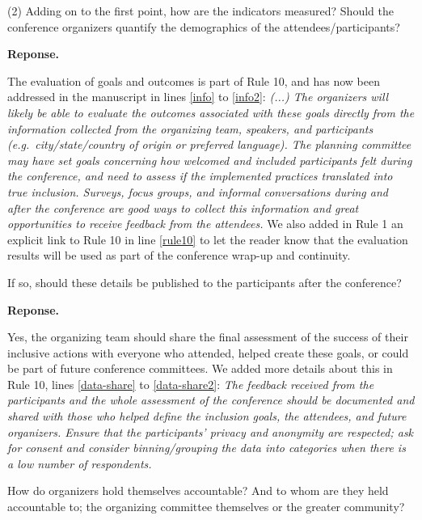 \documentclass{article}
\newenvironment{Reply}{\noindent\color{BlueViolet}\textbf{Reponse.}}{\vspace{1em}}
\begin{document}
(2) Adding on to the first point, how are the indicators measured? Should the conference organizers quantify the demographics of the attendees/participants? 

\begin{Reply}

The evaluation of goals and outcomes is part of Rule 10, and has now been addressed in the manuscript in lines \ref{info} to \ref{info2}:
\textit{
(...) The organizers will likely be able to evaluate the outcomes associated with these goals directly from the information collected from the organizing team, speakers, and participants (e.g.\ city/state/country of origin or preferred language).
The planning committee may have set goals concerning how welcomed and included participants felt during the conference, and need to assess if the implemented practices translated into true inclusion. 
Surveys, focus groups, and informal conversations during and after the conference are good ways to collect this information and great opportunities to receive feedback from the attendees.
}
We also added in Rule 1 an explicit link to Rule 10 in line \ref{rule10} to let the reader know that the evaluation results will be used as part of the conference wrap-up and continuity. 

\end{Reply}

If so, should these details be published to the participants after the conference? 

\begin{Reply}

Yes, the organizing team should share the final assessment of the success of their inclusive actions with everyone who attended, helped create these goals, or could be part of future conference committees. 
We added more details about this in Rule 10, lines \ref{data-share} to \ref{data-share2}:
\textit{The feedback received from the participants and the whole assessment of the conference should be documented and shared with those who helped define the inclusion goals, the attendees, and future organizers. 
Ensure that the participants' privacy and anonymity are respected; ask for consent and consider binning/grouping the data into categories when there is a low number of respondents.}
\end{Reply}

How do organizers hold themselves accountable? And to whom are they held accountable to; the organizing committee themselves or the greater community?
\end{document}
